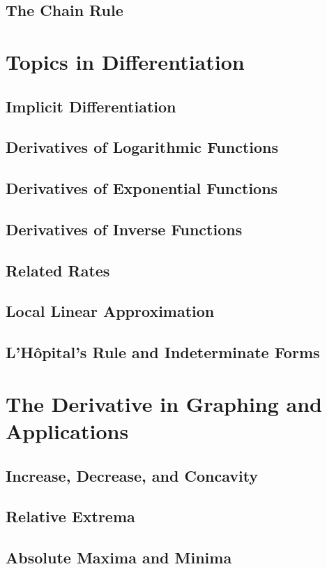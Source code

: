 \documentclass[letterpaper]{report}
\theoremstyle{definition}
\begin{document}
\section{The Chain Rule}

\chapter{Topics in Differentiation}
\section{Implicit Differentiation}
\section{Derivatives of Logarithmic Functions}
\section{Derivatives of Exponential Functions}
\section{Derivatives of Inverse Functions}
\section{Related Rates}
\section{Local Linear Approximation}
\section{L'H\^{o}pital's Rule and Indeterminate Forms}

\chapter{The Derivative in Graphing and Applications}
\section{Increase, Decrease, and Concavity}
\section{Relative Extrema}
\section{Absolute Maxima and Minima}
\end{document}
